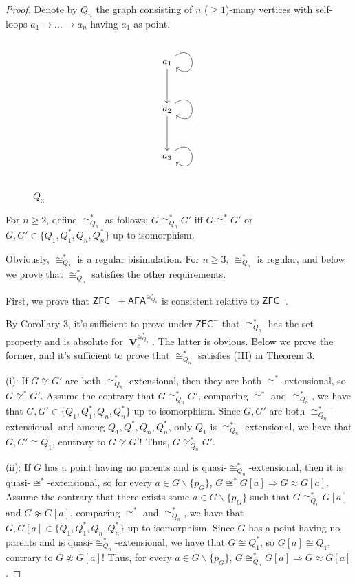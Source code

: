 \documentclass[10pt,a4paper]{amsart}
\newcommand{\afa}{\mathsf{AFA}}
\DeclareMathOperator{\uni}{\mathbf{V}}
\newcommand{\zfc}{\mathsf{ZFC}}
\begin{document}
\begin{proof}
    Denote by $Q_n$ the graph consisting of $n$ ($\geq 1$)-many vertices with self-loops $a_1\to\dots\to a_n$ having $a_1$ as point.
    
\begin{figure}[htbp]
\[\begin{tikzcd}
	{a_1} \\
	\\
	{a_2} \\
	\\
	{a_3}
	\arrow[from=1-1, to=1-1, loop, in=325, out=35, distance=10mm]
	\arrow[from=1-1, to=3-1]
	\arrow[from=3-1, to=3-1, loop, in=325, out=35, distance=10mm]
	\arrow[from=3-1, to=5-1]
	\arrow[from=5-1, to=5-1, loop, in=325, out=35, distance=10mm]
\end{tikzcd}\]
\caption{$Q_3$}
\end{figure}

    For $n\geq2$, define $\cong_{Q_n}^*$ as follows: $G\cong_{Q_n}^*G'$ iff $G\cong^*G'$ or $G,G'\in\{Q_1,Q_1^*,Q_n,Q_n^*\}$ up to isomorphism.
    
    Obviously, $\cong_{Q_2}^*$ is a regular bisimulation. For $n\geq3$, $\cong_{Q_n}^*$ is regular, and below we prove that $\cong_{Q_n}^*$ satisfies the other requirements.

    First, we prove that $\zfc^-+\afa^{\cong_{Q_n}^*}$ is consistent relative to $\zfc^-$.
    
    By Corollary 3, it's sufficient to prove under $\zfc^-$ that $\cong_{Q_n}^*$ has the set property and is absolute for $\uni_c^{\cong_{Q_n}^*}$.
    The latter is obvious. Below we prove the former, and it's sufficient to prove that $\cong_{Q_n}^*$ satisfies (III) in Theorem 3.
    
    (i): If $G\not\cong G'$ are both $\cong_{Q_n}^*$-extensional, then they are both $\cong^*$-extensional, so $G\not\cong^*G'$.
    Assume the contrary that $G\cong_{Q_n}^* G'$, comparing $\cong^*$ and $\cong_{Q_n}^*$, we have that $G,G'\in\{Q_1,Q_1^*,Q_n,Q_n^*\}$ up to isomorphism. Since $G,G'$ are both $\cong_{Q_n}^*$-extensional, and among $Q_1,Q_1^*,Q_n,Q_n^*$, only $Q_1$ is $\cong_{Q_n}^*$-extensional, we have that $G,G'\cong Q_1$, contrary to $G\not\cong G'$!
    Thus, $G\not\cong_{Q_n}^* G'$.
    
    (ii): If $G$ has a point having no parents and is quasi-$\cong_{Q_n}^*$-extensional, then it is quasi-$\cong^*$-extensional, so for every $a\in G\backslash\{p_G\}$, $G\cong^* G[a]\Rightarrow G\approx G[a]$.
    Assume the contrary that there exists some $a\in G\backslash\{p_G\}$ such that $G\cong_{Q_n}^* G[a]$ and $G\not\approx G[a]$, comparing $\cong^*$ and $\cong_{Q_n}^*$, we have that $G,G[a]\in\{Q_1,Q_1^*,Q_n,Q_n^*\}$ up to isomorphism. Since $G$ has a point having no parents and is quasi-$\cong_{Q_n}^*$-extensional, we have that $G\cong Q_1^*$, so $G[a]\cong Q_1$, contrary to $G\not\approx G[a]$!
    Thus, for every $a\in G\backslash\{p_G\}$, $G\cong_{Q_n}^* G[a]\Rightarrow G\approx G[a]$.
        

\end{proof}
\end{document}

